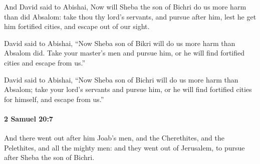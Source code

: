 			\begin{versebox}
					\item[BHS] 
					\item[ASV] And David said to Abishai, Now will Sheba the son of Bichri do us more harm than did Absalom: take thou thy lord's servants, and pursue after him, lest he get him fortified cities, and escape out of our sight.
					\item[NIV] David said to Abishai, “Now Sheba son of Bikri will do us more harm than Absalom did. Take your master’s men and pursue him, or he will find fortified cities and escape from us.”
					\item[NRSV] David said to Abishai, “Now Sheba son of Bichri will do us more harm than Absalom; take your lord’s servants and pursue him, or he will find fortified cities for himself, and escape from us.”
			\end{versebox}

		\paragraph{2 Samuel 20:7} %
			\label{2SAMUEL-20-7}

			And there went out after him Joab’s men, and the Cherethites, and the Pelethites, and all the mighty men: and they went out of Jerusalem, to pursue after Sheba the son of Bichri.

